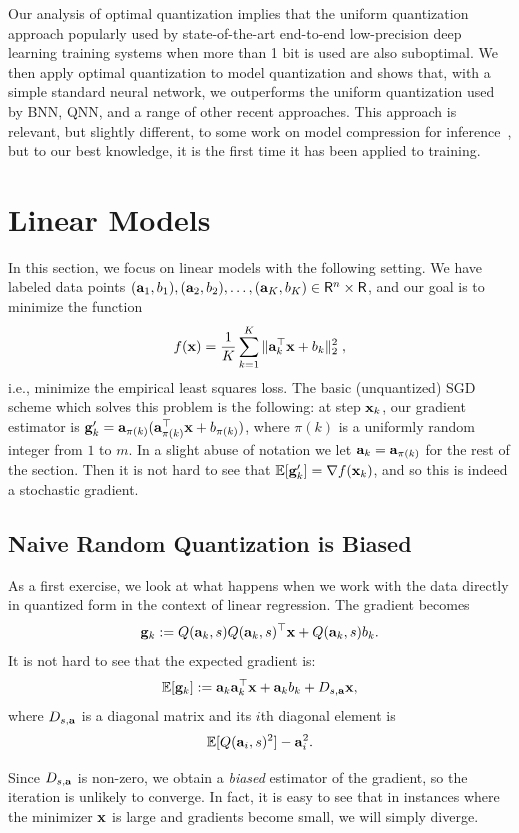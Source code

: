 \documentclass{article}
\newcommand{\R}{\mathsf{R}}
\def\a{{\bf a}}
\def\g{{\bf g}}
\def\x{{\bf x}}
\def\E{\mathbb{E}}
\begin{document}
Our analysis of optimal quantization 
implies that the uniform quantization approach
popularly used by state-of-the-art end-to-end
low-precision deep learning training systems
when more than 1 bit is used are also suboptimal.
We then apply optimal quantization to 
model quantization and shows that, with a simple
standard neural network, we outperforms the
uniform quantization used by BNN, QNN, and a
range of other recent approaches. This approach
is relevant, but slightly different, to some work 
on model compression for inference~\cite{XXX, YYY}, 
but to our best knowledge, it is the first time it 
has been applied to training. 


\section{Linear Models}

In this section, we focus on linear models with
the following setting.
We have labeled data points $(\a_1, b_1), (\a_2, b_2), \ldots, (\a_K, b_K) \in \R^n \times \R$, and our goal is to minimize the function
\[
f(\x) = \frac{1}{K} \sum_{k = 1}^K \| \a_k^\top \x + b_k \|_2^2 \; ,
\]
i.e., minimize the empirical least squares loss.
The basic (unquantized) SGD scheme which solves this problem is the following: at step $\x_k$, our gradient estimator is $\g'_k = \a_{\pi(k)} (\a_{\pi(k)}^\top \x + b_{\pi(k)})$, where $\pi(k)$ is a uniformly random integer from $1$ to $m$.
In a slight abuse of notation we let $\a_k = \a_{\pi(k)}$ for the rest of the section.
Then it is not hard to see that $\E [\g'_k] = \nabla f(\x_k)$, and so this is indeed a stochastic gradient.

\subsection{Naive Random Quantization is Biased}

As a first exercise, we look at what happens when we work with the data directly in quantized form in the context of linear regression. 
The gradient becomes
\[
\g_k := Q(\a_k, s ) Q(\a_k, s)^\top \x + Q(\a_k, s) b_k.
\]
It is not hard to see that the expected gradient is: 
\[
\E[\g_k] := \a_k \a_k^\top \x + \a_k b_k + D_{s, \a} \x, 
\]
where $D_{s, \a}$ is a diagonal matrix and its $i$th diagonal element is 
\[
\E[ Q(\a_i, s)^2 ] - \a_i^2.
\]

Since $D_{s, \a}$ is non-zero, we obtain a \emph{biased} estimator of the gradient, so the iteration is unlikely to converge. 
In fact, it is easy to see that in instances where the minimizer $\x$ is large and gradients become small, we will simply diverge. 
\end{document}

